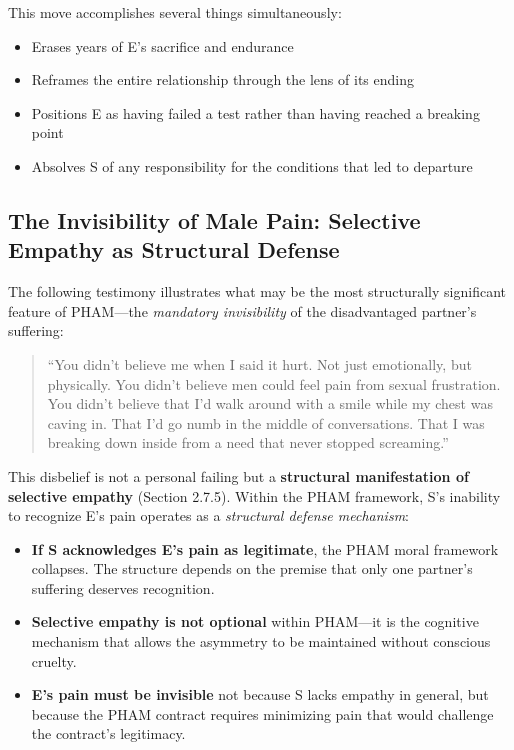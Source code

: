 \documentclass[12pt,openany]{book}
\numberwithin{equation}{chapter}
\begin{document}
This move accomplishes several things simultaneously:
\begin{itemize}
    \item Erases years of E's sacrifice and endurance
    \item Reframes the entire relationship through the lens of its ending
    \item Positions E as having failed a test rather than having reached a breaking point
    \item Absolves S of any responsibility for the conditions that led to departure
\end{itemize}

\subsection{The Invisibility of Male Pain: Selective Empathy as Structural Defense}

The following testimony illustrates what may be the most structurally significant feature of PHAM---the \textit{mandatory invisibility} of the disadvantaged partner's suffering:

\begin{quote}
``You didn't believe me when I said it hurt. Not just emotionally, but physically. You didn't believe men could feel pain from sexual frustration. You didn't believe that I'd walk around with a smile while my chest was caving in. That I'd go numb in the middle of conversations. That I was breaking down inside from a need that never stopped screaming.''
\end{quote}

This disbelief is not a personal failing but a \textbf{structural manifestation of selective empathy} (Section 2.7.5). Within the PHAM framework, S's inability to recognize E's pain operates as a \textit{structural defense mechanism}:

\begin{itemize}
    \item \textbf{If S acknowledges E's pain as legitimate}, the PHAM moral framework collapses. The structure depends on the premise that only one partner's suffering deserves recognition.
    \item \textbf{Selective empathy is not optional} within PHAM---it is the cognitive mechanism that allows the asymmetry to be maintained without conscious cruelty.
    \item \textbf{E's pain must be invisible} not because S lacks empathy in general, but because the PHAM contract requires minimizing pain that would challenge the contract's legitimacy.
\end{itemize}
\end{document}
